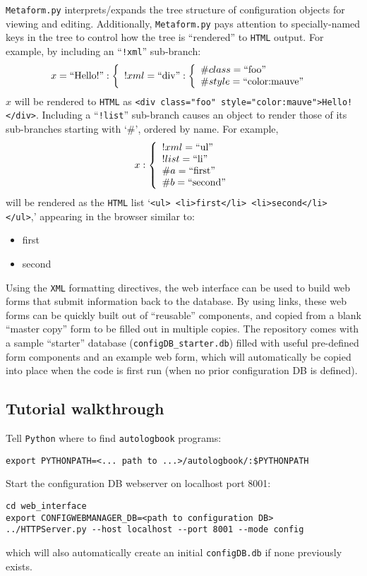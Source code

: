 \documentclass[12pt,english]{article}
\newcommand{\cd}[1]{\texttt{#1}}
\begin{document}
\cd{Metaform.py} interprets/expands the tree structure of configuration objects for viewing and editing.
Additionally, \cd{Metaform.py} pays attention to specially-named keys in the tree to control how the tree is ``rendered'' to \cd{HTML} output.
For example, by including an ``\cd{!xml}'' sub-branch:
\[ x = \textrm{``Hello!''}:  \left\{ \begin{array}{l} !xml = \textrm{``div''}: \left\{ \begin{array}{l} \#class = \textrm{``foo''} \\ \#style = \textrm{``color:mauve''}  \end{array} \right.  \end{array} \right.\]
$x$ will be rendered to \cd{HTML} as \verb#<div class="foo" style="color:mauve">Hello!</div>#.
Including a ``\cd{!list}'' sub-branch causes an object to render those of its sub-branches starting with `\#', ordered by name.
For example,
\[ x: \left\{ \begin{array}{l} !xml = \textrm{``ul''} \\ !list = \textrm{``li''} \\ \#a = \textrm{``first''} \\ \#b = \textrm{``second''}  \end{array} \right.\]
will be rendered as the \cd{HTML} list `\verb#<ul> <li>first</li> <li>second</li> </ul>#,' appearing in the browser similar to:
\begin{itemize}
\item first
\item second
\end{itemize}
Using the \cd{XML} formatting directives, the web interface can be used to build web forms that submit information back to the database.
By using links, these web forms can be quickly built out of ``reusable'' components,
	and copied from a blank ``master copy'' form to be filled out in multiple copies.
The repository comes with a sample ``starter'' database (\cd{configDB\_starter.db})
	filled with useful pre-defined form components and an example web form,
	which will automatically be copied into place when the code is first run (when no prior configuration DB is defined).

%
%
\subsection{Tutorial walkthrough}

Tell \cd{Python} where to find \cd{autologbook} programs:
\begin{verbatim}
export PYTHONPATH=<... path to ...>/autologbook/:$PYTHONPATH
\end{verbatim}
Start the configuration DB webserver on localhost port 8001:
\begin{verbatim}
cd web_interface
export CONFIGWEBMANAGER_DB=<path to configuration DB>
../HTTPServer.py --host localhost --port 8001 --mode config
\end{verbatim}
which will also automatically create an initial \cd{configDB.db} if none previously exists.
\end{document}
